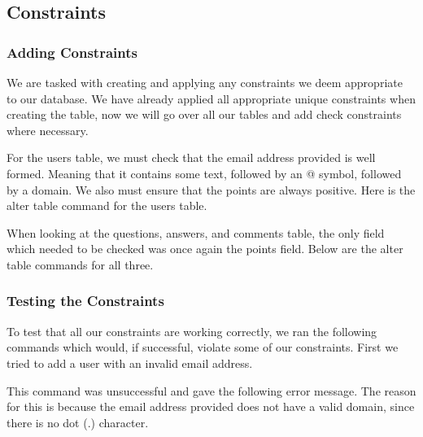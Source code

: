 \subsection{Constraints}

\subsubsection{Adding Constraints}

We are tasked with creating and applying any constraints we deem appropriate to our database. We have already applied all appropriate unique constraints when creating the table, now we will go over all our tables and add check constraints where necessary.

For the users table, we must check that the email address provided is well formed. Meaning that it contains some text, followed by an @ symbol, followed by a domain. We also must ensure that the points are always positive. Here is the alter table command for the users table.


When looking at the questions, answers, and comments table, the only field which needed to be checked was once again the points field. Below are the alter table commands for all three.


\subsubsection{Testing the Constraints}

To test that all our constraints are working correctly, we ran the following commands which would, if successful, violate some of our constraints. First we tried to add a user with an invalid email address.


This command was unsuccessful and gave the following error message. The reason for this is because the email address provided does not have a valid domain, since there is no dot (.) character.

